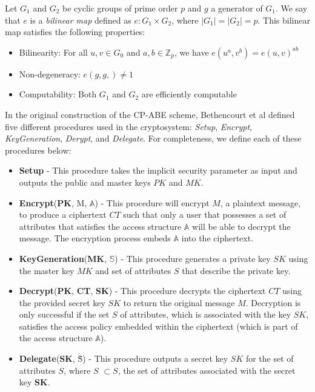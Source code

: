 \documentclass{sig-alternate}
\newenvironment{definition}[1][Definition]{\begin{trivlist}
\item[\hskip \labelsep {\bfseries #1}]}{\end{trivlist}}
\begin{document}
\begin{definition}
Let $G_1$ and $G_2$ be cyclic groups of prime order $p$ and $g$ a generator of $G_1$. We say that $e$ is a \emph{bilinear map} defined as $e : G_1 \times G_2$, where $|G_1| = |G_2| = p$. This bilinear map satisfies the following properties:
\begin{itemize}
	\item Bilinearity: For all $u, v \in G_0$ and $a, b \in \mathbb{Z}_p$, we have $e(u^a, v^b) = e(u,v)^{ab}$
	\item Non-degeneracy: $e(g, g,) \not= 1$
	\item Computability: Both $G_1$ and $G_2$ are efficiently computable
\end{itemize}
\end{definition}

In the original construction of the CP-ABE scheme, Bethencourt et al \cite{Bethencourt2007-CPABE} defined five different procedures 
used in the cryptosystem: \emph{Setup}, \emph{Encrypt}, \emph{KeyGeneration}, \emph{Derypt}, and 
\emph{Delegate}. For completeness, we define each of these procedures below:
\begin{itemize}
	\item \textbf{Setup} - This procedure takes the implicit security parameter as input and outputs the public and master keys $PK$ and $MK$.
	\item \textbf{Encrypt}(\textbf{PK}, M, $\mathbb{A}$) - This procedure will encrypt $M$, a plaintext message, to produce a ciphertext $CT$ such that only a user that possesses a set of attributes that satisfies the access structure $\mathbb{A}$ will be able to decrypt the message. The encryption process embeds $\mathbb{A}$ into the ciphertext.
	\item \textbf{KeyGeneration}(\textbf{MK}, $\mathbb{S}$) - This procedure generates a private key $SK$ using the master key $MK$ and set of attributes $S$ that describe the private key. 
	\item \textbf{Decrypt}(\textbf{PK}, \textbf{CT}, \textbf{SK}) - This procedure decrypts the ciphertext $CT$ using the provided secret key $SK$ to return the original message $M$. Decryption is only successful if the set $S$ of attributes, which is associated with the key $SK$, satisfies the access policy embedded within the ciphertext (which is part of the access structure $\mathbb{A}$).
	\item \textbf{Delegate}(\textbf{SK}, \~{S}) - This procedure outputs a secret key \~{$SK$} for the set of attributes \~{$S$}, where \~{$S$} $\subset S$, the set of attributes associated with the secret key \textbf{SK}.
\end{itemize}
\end{document}
